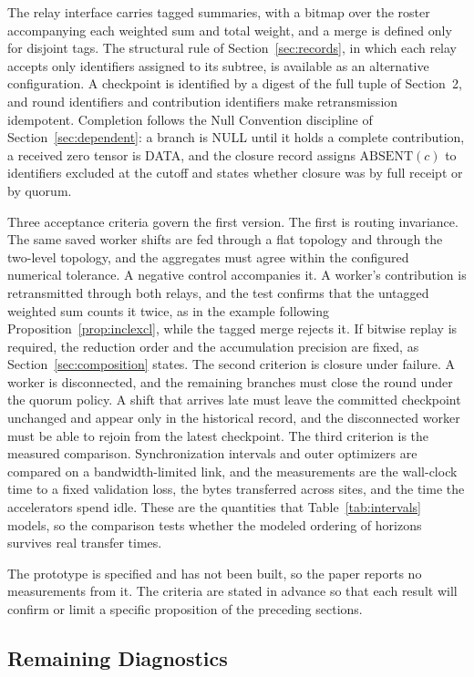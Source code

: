 \documentclass[11pt]{article}
\theoremstyle{definition}
\theoremstyle{remark}
\begin{document}
The relay interface carries tagged summaries, with a bitmap over the roster accompanying each weighted sum and total weight, and a merge is defined only for disjoint tags. The structural rule of Section~\ref{sec:records}, in which each relay accepts only identifiers assigned to its subtree, is available as an alternative configuration. A checkpoint is identified by a digest of the full tuple of Section~2, and round identifiers and contribution identifiers make retransmission idempotent. Completion follows the Null Convention discipline of Section~\ref{sec:dependent}: a branch is NULL until it holds a complete contribution, a received zero tensor is DATA, and the closure record assigns $\mathrm{ABSENT}(c)$ to identifiers excluded at the cutoff and states whether closure was by full receipt or by quorum.

Three acceptance criteria govern the first version. The first is routing invariance. The same saved worker shifts are fed through a flat topology and through the two-level topology, and the aggregates must agree within the configured numerical tolerance. A negative control accompanies it. A worker's contribution is retransmitted through both relays, and the test confirms that the untagged weighted sum counts it twice, as in the example following Proposition~\ref{prop:inclexcl}, while the tagged merge rejects it. If bitwise replay is required, the reduction order and the accumulation precision are fixed, as Section~\ref{sec:composition} states. The second criterion is closure under failure. A worker is disconnected, and the remaining branches must close the round under the quorum policy. A shift that arrives late must leave the committed checkpoint unchanged and appear only in the historical record, and the disconnected worker must be able to rejoin from the latest checkpoint. The third criterion is the measured comparison. Synchronization intervals and outer optimizers are compared on a bandwidth-limited link, and the measurements are the wall-clock time to a fixed validation loss, the bytes transferred across sites, and the time the accelerators spend idle. These are the quantities that Table~\ref{tab:intervals} models, so the comparison tests whether the modeled ordering of horizons survives real transfer times.

The prototype is specified and has not been built, so the paper reports no measurements from it. The criteria are stated in advance so that each result will confirm or limit a specific proposition of the preceding sections.

\subsection{Remaining Diagnostics}
\end{document}
